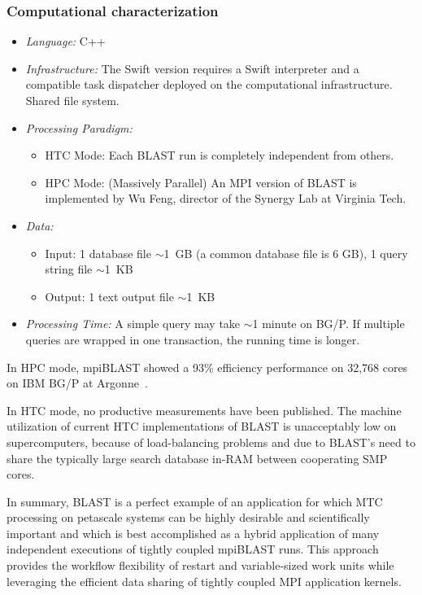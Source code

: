 \documentclass[10pt,letterpaper]{article}
\begin{document}
\subsubsection{Computational characterization}
\begin {itemize}
\item {\em Language:} C++
\item {\em Infrastructure:}  The Swift version requires a Swift interpreter and a compatible 
        task dispatcher deployed on the computational infrastructure.  
        Shared file system.
        
\item {\em Processing Paradigm:}
  \begin{itemize}
  \item HTC Mode: Each BLAST run is completely independent from others.
  \item HPC Mode: (Massively Parallel) An MPI version of BLAST is implemented by Wu Feng, director of the Synergy Lab at Virginia Tech.
  \end{itemize}

\item {\em Data:}
  \begin{itemize}
  \item Input: 1 database file $\sim$1~GB (a common database file is 6 GB), 1 query string file $\sim$1~KB
  \item Output: 1 text output file $\sim$1~KB
  \end{itemize}

\item {\em Processing Time:} A simple query may take $\sim$1 minute on BG/P. If multiple queries are wrapped in one transaction, the running time is longer.
\end{itemize}

In  HPC mode, mpiBLAST showed a 93\% efficiency performance on 32,768 cores on IBM BG/P at Argonne~\cite{mpiBLAST-SC-08}.

In  HTC mode, no productive measurements have been published. The machine utilization of current HTC implementations of BLAST is unacceptably low on supercomputers,
  because of load-balancing problems and due to BLAST's need to share the typically large search database in-RAM between cooperating SMP cores.~\cite{mpiBLAST-SC-08}

In summary, BLAST is a perfect example of an application for which MTC processing on petascale systems can be highly desirable and scientifically important and which is best accomplished as a hybrid application of many independent executions of tightly coupled mpiBLAST runs. This approach provides the workflow flexibility of restart and variable-sized work units while leveraging the efficient data sharing of tightly coupled MPI application kernels.
\end{document}
